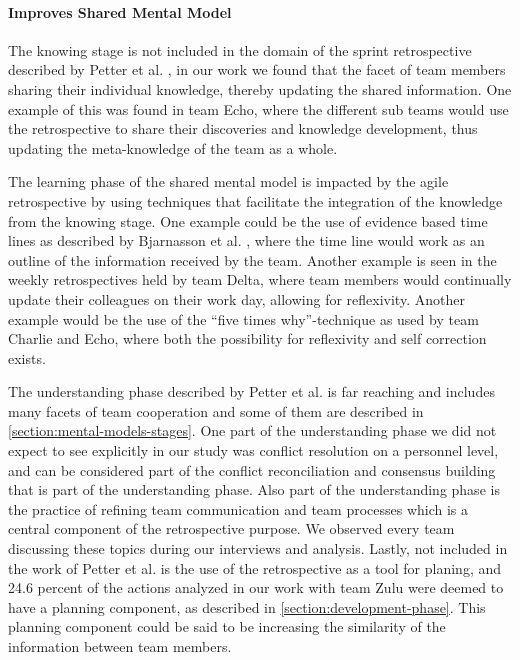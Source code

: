 \paragraph{Improves Shared Mental Model}
The knowing stage is not included in the domain of the sprint retrospective described by Petter et al. \cite{Petter2013}, in our work we found that the facet of team members sharing their individual knowledge, thereby updating the shared information. One example of this was found in team Echo, where the different sub teams would use the retrospective to share their discoveries and knowledge development, thus updating the meta-knowledge of the team as a whole. 

The learning phase of the shared mental model is impacted by the agile retrospective by using techniques that facilitate the integration of the knowledge from the knowing stage. One example could be the use of evidence based time lines as described by Bjarnasson et al. \cite{Bjarnason2012}, where the time line would work as an outline of the information received by the team. Another example is seen in the weekly retrospectives held by team Delta, where team members would continually update their colleagues on their work day, allowing for reflexivity. Another example would be the use of the ``five times why''-technique as used by team Charlie and Echo, where both the possibility for reflexivity and self correction exists.

The understanding phase described by Petter et al. \cite{Petter2013} is far reaching and includes many facets of team cooperation and some of them are described in \autoref{section:mental-models-stages}. One part of the understanding phase we did not expect to see explicitly in our study was conflict resolution on a personnel level, and can be considered part of the conflict reconciliation and consensus building that is part of the understanding phase. Also part of the understanding phase is the practice of refining team communication and team processes which is a central component of the retrospective purpose. We observed every team discussing these topics during our interviews and analysis. Lastly, not included in the work of Petter et al. is the use of the retrospective as a tool for planing, and 24.6 percent of the actions analyzed in our work with team Zulu were deemed to have a planning component, as described in \autoref{section:development-phase}. This planning component could be said to be increasing the similarity of the information between team members.

